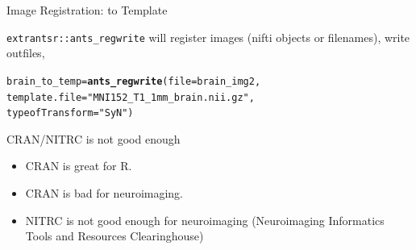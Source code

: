 \documentclass[11pt]{beamer}\usepackage[]{graphicx}\usepackage[]{color}
\makeatletter
\newcommand{\hlstr}[1]{\textcolor[rgb]{0.192,0.494,0.8}{#1}}%
\newcommand{\hlstd}[1]{\textcolor[rgb]{0.345,0.345,0.345}{#1}}%
\newcommand{\hlkwb}[1]{\textcolor[rgb]{0.69,0.353,0.396}{#1}}%
\newcommand{\hlkwc}[1]{\textcolor[rgb]{0.333,0.667,0.333}{#1}}%
\newcommand{\hlkwd}[1]{\textcolor[rgb]{0.737,0.353,0.396}{\textbf{#1}}}%
\newenvironment{kframe}{%
 \def\at@end@of@kframe{}%
 \ifinner\ifhmode%
  \def\at@end@of@kframe{\end{minipage}}%
  \begin{minipage}{\columnwidth}%
 \fi\fi%
 \def\FrameCommand##1{\hskip\@totalleftmargin \hskip-\fboxsep
 \colorbox{shadecolor}{##1}\hskip-\fboxsep
     \hskip-\linewidth \hskip-\@totalleftmargin \hskip\columnwidth}%
 \MakeFramed {\advance\hsize-\width
   \@totalleftmargin\z@ \linewidth\hsize
   \@setminipage}}%
 {\par\unskip\endMakeFramed%
 \at@end@of@kframe}
\newenvironment{knitrout}{}{} %
\makeatother
\begin{document}
\begin{frame}[fragile]{Image Registration: to Template}

\verb|extrantsr::ants_regwrite| will register images (nifti objects or filenames), write outfiles, 



\begin{knitrout}
\color{fgcolor}\begin{kframe}
\begin{alltt}
\hlstd{brain_to_temp} \hlkwb{=} \hlkwd{ants_regwrite}\hlstd{(}\hlkwc{file} \hlstd{= brain_img2,}
                              \hlkwc{template.file} \hlstd{=} \hlstr{"MNI152_T1_1mm_brain.nii.gz"}\hlstd{,}
                              \hlkwc{typeofTransform} \hlstd{=} \hlstr{"SyN"}\hlstd{)}
\end{alltt}
\end{kframe}
\end{knitrout}

\end{frame}




% 
% 


\begin{frame}[fragile]{CRAN/NITRC is not good enough}

\begin{itemize}
\item CRAN is great for R.

\item CRAN is bad for neuroimaging.

\item NITRC is not good enough for neuroimaging (Neuroimaging Informatics Tools and Resources Clearinghouse)

\end{itemize}
\end{frame}
\end{document}
